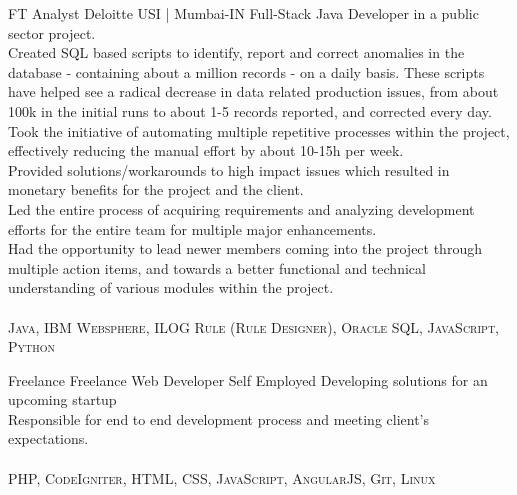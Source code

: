 \documentclass[10pt]{article} %
\begin{document}
\begin{paracol}{2}


{FT} %
{Analyst} %
{Deloitte USI | Mumbai-IN} %
{
\raisebox{-0.5pt}{\faAngleRight} Full-Stack Java Developer in a public sector project.\\
\raisebox{-0.5pt}{\faAngleRight} Created SQL based scripts to identify, report and correct anomalies in the database - containing about a million records - on a daily basis. These scripts have helped see a radical decrease in data related production issues, from about 100k in the initial runs to about 1-5 records reported, and corrected every day. \\
\raisebox{-0.5pt}{\faAngleRight} Took the initiative of automating multiple repetitive processes within the project, effectively reducing the manual effort by about 10-15h per week.\\
\raisebox{-0.5pt}{\faAngleRight} Provided solutions/workarounds to high impact issues which resulted in monetary benefits for the project and the client.\\
\raisebox{-0.5pt}{\faAngleRight} Led the entire process of acquiring requirements and analyzing development efforts for the entire team for multiple major enhancements.\\
\raisebox{-0.5pt}{\faAngleRight} Had the opportunity to lead newer members coming into the project through multiple action items, and towards a better functional and technical understanding of various modules within the project.\\
\\
\textbf{\faCode} \textsc{Java, IBM Websphere, ILOG Rule (Rule Designer), Oracle SQL, JavaScript, Python}
} %


{Freelance} %
{Freelance Web Developer} %
{Self Employed} %
{
\raisebox{-0.5pt}{\faAngleRight} Developing solutions for an upcoming startup\\
\raisebox{-0.5pt}{\faAngleRight} Responsible for end to end development process and meeting client's expectations.\\
\\
\textbf{\faCode} \textsc{PHP, CodeIgniter, HTML, CSS, JavaScript, AngularJS, Git, Linux}
} %


\end{paracol}
\end{document}

